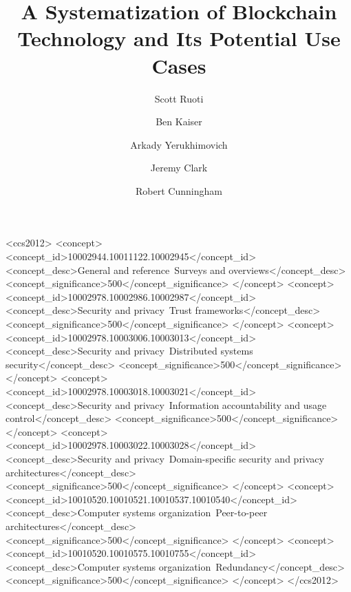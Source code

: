 \documentclass[acmsmall]{acmart}
\begin{document}
	

	
\title{A Systematization of Blockchain Technology and Its Potential Use Cases}

\author{Scott Ruoti}

\author{Ben Kaiser}
\authornotemark[1]

\author{Arkady Yerukhimovich}
\authornotemark[1]

\author{Jeremy Clark}

\author{Robert Cunningham}
\authornotemark[1]

\renewcommand{\shortauthors}{Ruoti et al.}



%
%
\begin{CCSXML}
	<ccs2012>
	<concept>
	<concept_id>10002944.10011122.10002945</concept_id>
	<concept_desc>General and reference~Surveys and overviews</concept_desc>
	<concept_significance>500</concept_significance>
	</concept>
	<concept>
	<concept_id>10002978.10002986.10002987</concept_id>
	<concept_desc>Security and privacy~Trust frameworks</concept_desc>
	<concept_significance>500</concept_significance>
	</concept>
	<concept>
	<concept_id>10002978.10003006.10003013</concept_id>
	<concept_desc>Security and privacy~Distributed systems security</concept_desc>
	<concept_significance>500</concept_significance>
	</concept>
	<concept>
	<concept_id>10002978.10003018.10003021</concept_id>
	<concept_desc>Security and privacy~Information accountability and usage control</concept_desc>
	<concept_significance>500</concept_significance>
	</concept>
	<concept>
	<concept_id>10002978.10003022.10003028</concept_id>
	<concept_desc>Security and privacy~Domain-specific security and privacy architectures</concept_desc>
	<concept_significance>500</concept_significance>
	</concept>
	<concept>
	<concept_id>10010520.10010521.10010537.10010540</concept_id>
	<concept_desc>Computer systems organization~Peer-to-peer architectures</concept_desc>
	<concept_significance>500</concept_significance>
	</concept>
	<concept>
	<concept_id>10010520.10010575.10010755</concept_id>
	<concept_desc>Computer systems organization~Redundancy</concept_desc>
	<concept_significance>500</concept_significance>
	</concept>
	</ccs2012>
\end{CCSXML}
\end{document}
